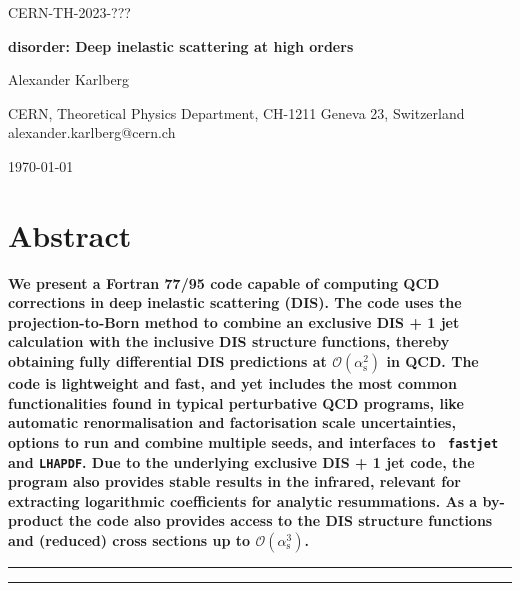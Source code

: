 \documentclass[submission, PhysCodeb]{SciPost}
\newcommand{\as}{\alpha_{\mathrm{s}}}
\begin{document}
\begin{flushright}
CERN-TH-2023-???
\end{flushright}
\begin{center}{\Large \textbf{
disorder: Deep inelastic scattering at high orders\\
}}\end{center}

\begin{center}
Alexander Karlberg
\end{center}

\begin{center}
CERN, Theoretical Physics Department, CH-1211 Geneva 23, Switzerland
\\
{\small \sf alexander.karlberg@cern.ch}
\end{center}

\begin{center}
\today
\end{center}


\section*{Abstract}
{\bf
We present a Fortran 77/95 code capable of computing QCD corrections
in deep inelastic scattering (DIS). The code uses the
projection-to-Born method to combine an exclusive DIS + 1 jet
calculation with the inclusive DIS structure functions, thereby
obtaining fully differential DIS predictions at $\mathcal{O}(\as^2)$
in QCD. The code is lightweight and fast, and yet includes the most
common functionalities found in typical perturbative QCD programs,
like automatic renormalisation and factorisation scale uncertainties,
options to run and combine multiple seeds, and interfaces to {\tt
  fastjet} and {\tt LHAPDF}. Due to the underlying exclusive DIS + 1
jet code, the program also provides stable results in the infrared,
relevant for extracting logarithmic coefficients for analytic
resummations. As a by-product the code also provides access to the DIS
structure functions and (reduced) cross sections up to
$\mathcal{O}(\as^3)$.}


\vspace{10pt}
\noindent\rule{\textwidth}{1pt}
\tableofcontents\thispagestyle{fancy}
\noindent\rule{\textwidth}{1pt}
\vspace{10pt}
\end{document}
